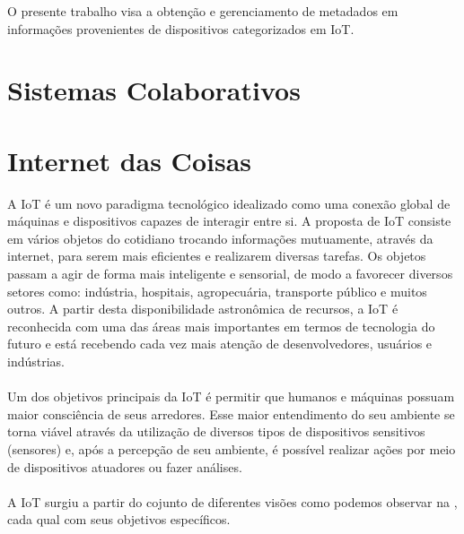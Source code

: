 O presente trabalho visa a obtenção e gerenciamento de metadados em informações provenientes de
dispositivos categorizados em \acrfull{IoT}. %

\section{Sistemas Colaborativos}


\section{Internet das Coisas}%
\quad
A \acrlong{IoT} é um novo paradigma tecnológico idealizado como uma conexão global
de máquinas e dispositivos capazes de interagir entre si. A proposta de \acrshort{IoT} consiste em vários objetos do cotidiano trocando informações
mutuamente, através da internet, para serem mais eficientes e realizarem diversas tarefas.
Os objetos passam a agir de forma mais inteligente e sensorial, de modo a favorecer diversos setores como:
indústria, hospitais, agropecuária, transporte público e muitos outros. A partir desta
disponibilidade astronômica de recursos, a \acrshort{IoT} é reconhecida com uma das áreas mais importantes
em termos de tecnologia do futuro e está recebendo cada vez mais atenção de desenvolvedores, usuários e indústrias.
\\\\ \null
\quad
Um dos objetivos principais da \acrlong{IoT} é permitir
que humanos e máquinas possuam maior consciência de seus arredores.
 Esse maior entendimento do seu ambiente se torna viável através da utilização
 de diversos tipos de dispositivos sensitivos (sensores) e, após a percepção
 de seu ambiente, é possível realizar ações por meio de dispositivos atuadores ou fazer análises.\\\\ \null
 \quad
 A \acrlong{IoT} surgiu a partir do cojunto de diferentes visões como podemos observar na , cada qual com seus objetivos específicos.

